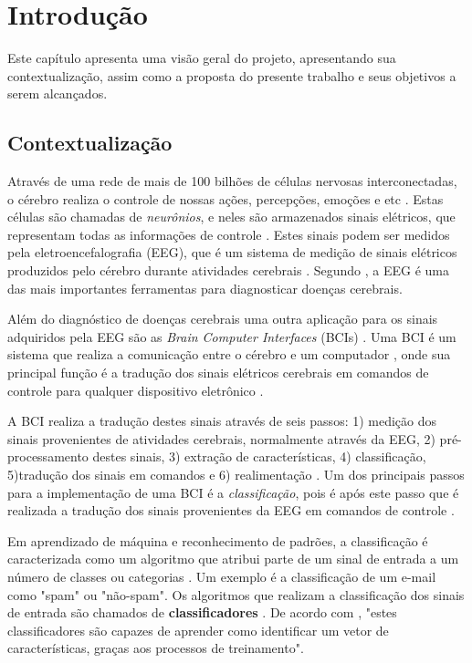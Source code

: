 \chapter[Introdução]{Introdução}

Este capítulo apresenta uma visão geral do projeto, apresentando sua contextualização, assim como a proposta do presente trabalho e seus objetivos a serem alcançados.

\section{Contextualização}

Através de uma rede de mais de 100 bilhões de células nervosas interconectadas, o cérebro
realiza o controle de nossas ações, percepções, emoções e etc \cite{KANDEL}. Estas células
são chamadas de \textit{neurônios}, e neles são armazenados sinais elétricos, que representam
todas as informações de controle \cite{Siulybook}. Estes sinais podem ser medidos pela
eletroencefalografia (EEG), que é um sistema de medição de sinais elétricos produzidos pelo
cérebro durante atividades cerebrais \cite{F.Lotte}. Segundo \cite{SIULYDissertacao}, a EEG
é uma das mais importantes ferramentas para diagnosticar doenças cerebrais.

Além do diagnóstico de doenças cerebrais uma outra aplicação para os sinais adquiridos
pela EEG são as \textit{Brain Computer Interfaces} (BCIs) \cite{F.Lotte}. Uma BCI é um
sistema que realiza a comunicação entre o cérebro e um computador \cite{Siulybook}, onde
sua principal função é a tradução dos sinais elétricos cerebrais em comandos
de controle para qualquer dispositivo eletrônico \cite{Siulybook}.

A BCI realiza a tradução destes sinais através de seis passos: 1) medição dos sinais
provenientes de atividades cerebrais, normalmente através da EEG, 2) pré-processamento destes sinais,
3) extração de características, 4) classificação, 5)tradução dos sinais em comandos e 6)
realimentação \cite{MasonAndBirch}. Um dos principais passos para a implementação de uma
BCI é a \textit{classificação}, pois é após este passo que é realizada a tradução dos sinais provenientes da EEG
em comandos de controle \cite{MasonAndBirch}.

Em aprendizado de máquina e reconhecimento de padrões, a classificação é caracterizada como um algoritmo que atribui parte de um sinal de entrada a um número de
classes ou categorias \cite{brunelli2009template}. Um exemplo é a classificação de um e-mail
como "spam" ou "não-spam". Os algoritmos que realizam a classificação dos sinais de entrada são
chamados de \textbf{classificadores} \cite{Siulybook}. De acordo com \cite[p. 41]{lottephd}, "estes
classificadores são capazes de aprender como identificar um vetor de características, graças
aos processos de treinamento".

